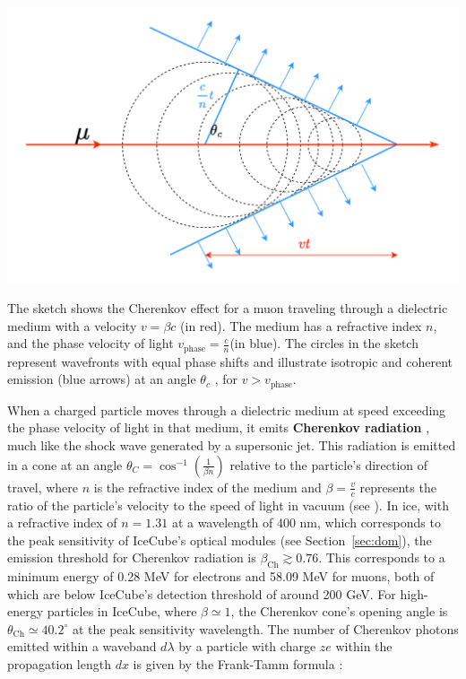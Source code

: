 \begin{marginfigure}
    \includegraphics{./figures/nu_in_icecube/Cherenkov.pdf}
    \caption[Illustration of Cherenkov effect]{The sketch shows the Cherenkov effect for a muon traveling through a dielectric medium with a velocity $v = \beta c$ (in red). The medium has a refractive index $n$, and the phase velocity of light $v_\mathrm{phase} = \frac{c}{n} $(in blue). The circles in the sketch represent wavefronts with equal phase shifts and illustrate isotropic and coherent emission (blue arrows) at an angle $\theta_c$ , for $v>v_\mathrm{phase}$.}
\end{marginfigure}

When a charged particle moves through a dielectric medium at speed exceeding the phase velocity of light in that medium, it emits \textbf{Cherenkov radiation} , much like the shock wave generated by a supersonic jet. This radiation is emitted in a cone at an angle $\theta_C = \cos^{-1}\left(\frac{1}{\beta n}\right)$ relative to the particle's direction of travel, where $n$ is the refractive index of the medium and $\beta = \frac{v}{c}$ represents the ratio of the particle's velocity to the speed of light in vacuum (see ). In ice, with a refractive index of $n = 1.31$ at a wavelength of 400 nm, which corresponds to the peak sensitivity of IceCube's optical modules (see Section~\ref{sec:dom}), the emission threshold for Cherenkov radiation is $\beta_\text{Ch} \gtrsim 0.76$. This corresponds to a minimum energy of 0.28 MeV for electrons and 58.09 MeV for muons, both of which are below IceCube's detection threshold of around 200 GeV. For high-energy particles in IceCube, where $\beta \simeq 1$, the Cherenkov cone's opening angle is $\theta_\text{Ch} \simeq 40.2^\circ$ at the peak sensitivity wavelength. The number of Cherenkov photons emitted within a waveband $d\lambda$ by a particle with charge $ze$ within the propagation length $dx$ is given by the Frank-Tamm formula :

